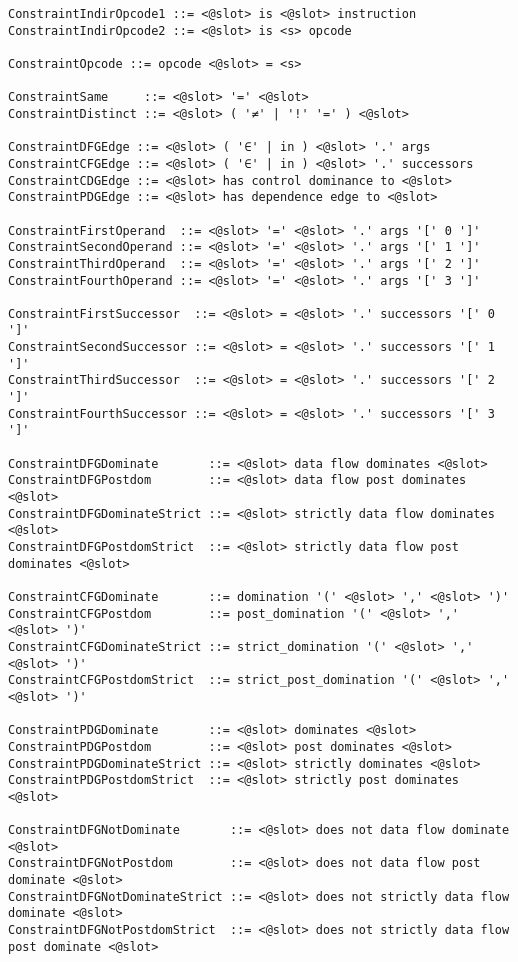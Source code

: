 \begin{lstlisting}[language={},basicstyle=\small\ttfamily,
                   numbers=none,framexleftmargin=0pt,xleftmargin=0pt,]
ConstraintIndirOpcode1 ::= <@slot> is <@slot> instruction
ConstraintIndirOpcode2 ::= <@slot> is <s> opcode

ConstraintOpcode ::= opcode <@slot> = <s>

ConstraintSame     ::= <@slot> '=' <@slot>
ConstraintDistinct ::= <@slot> ( '≠' | '!' '=' ) <@slot>

ConstraintDFGEdge ::= <@slot> ( '∈' | in ) <@slot> '.' args
ConstraintCFGEdge ::= <@slot> ( '∈' | in ) <@slot> '.' successors
ConstraintCDGEdge ::= <@slot> has control dominance to <@slot>
ConstraintPDGEdge ::= <@slot> has dependence edge to <@slot>

ConstraintFirstOperand  ::= <@slot> '=' <@slot> '.' args '[' 0 ']'
ConstraintSecondOperand ::= <@slot> '=' <@slot> '.' args '[' 1 ']'
ConstraintThirdOperand  ::= <@slot> '=' <@slot> '.' args '[' 2 ']'
ConstraintFourthOperand ::= <@slot> '=' <@slot> '.' args '[' 3 ']'

ConstraintFirstSuccessor  ::= <@slot> = <@slot> '.' successors '[' 0 ']'
ConstraintSecondSuccessor ::= <@slot> = <@slot> '.' successors '[' 1 ']'
ConstraintThirdSuccessor  ::= <@slot> = <@slot> '.' successors '[' 2 ']'
ConstraintFourthSuccessor ::= <@slot> = <@slot> '.' successors '[' 3 ']'

ConstraintDFGDominate       ::= <@slot> data flow dominates <@slot>
ConstraintDFGPostdom        ::= <@slot> data flow post dominates <@slot>
ConstraintDFGDominateStrict ::= <@slot> strictly data flow dominates <@slot>
ConstraintDFGPostdomStrict  ::= <@slot> strictly data flow post dominates <@slot>

ConstraintCFGDominate       ::= domination '(' <@slot> ',' <@slot> ')'
ConstraintCFGPostdom        ::= post_domination '(' <@slot> ',' <@slot> ')'
ConstraintCFGDominateStrict ::= strict_domination '(' <@slot> ',' <@slot> ')'
ConstraintCFGPostdomStrict  ::= strict_post_domination '(' <@slot> ',' <@slot> ')'

ConstraintPDGDominate       ::= <@slot> dominates <@slot>
ConstraintPDGPostdom        ::= <@slot> post dominates <@slot>
ConstraintPDGDominateStrict ::= <@slot> strictly dominates <@slot>
ConstraintPDGPostdomStrict  ::= <@slot> strictly post dominates <@slot>

ConstraintDFGNotDominate       ::= <@slot> does not data flow dominate <@slot>
ConstraintDFGNotPostdom        ::= <@slot> does not data flow post dominate <@slot>
ConstraintDFGNotDominateStrict ::= <@slot> does not strictly data flow dominate <@slot>
ConstraintDFGNotPostdomStrict  ::= <@slot> does not strictly data flow post dominate <@slot>


\end{lstlisting}
